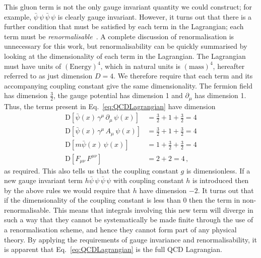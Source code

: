 This gluon term is not the only gauge invariant quantity we could construct; for example, $\bar{\psi}\,\psi\,\bar{\psi}\,\psi$ is clearly gauge invariant. However, it turns out that there is a further condition that must be satisfied by each term in the Lagrangian; each term must be \textit{renormalisable}~\cite{peskin2018introduction}. A complete discussion of renormalisation is unnecessary for this work, but renormalisability can be quickly summarised by looking at the dimensionality of each term in the Lagrangian. The Lagrangian must have units of $(\text{Energy})^4$, which in natural units is $(\text{mass})^4$,  hereafter referred to as just dimension $D=4$. We therefore require that each term and its accompanying coupling constant give the same dimensionality. The fermion field has dimension $\frac{3}{2}$, the gauge potential has dimension 1 and $\partial_\mu$ has dimension 1. Thus, the terms present in Eq.~\eqref{eq:QCDLagrangian} have dimension
%
\begin{align}
\text{D}[\bar{\psi}(x)\,\gamma^\mu\,\partial_\mu\,\psi(x)]&=\frac{3}{2}+1+\frac{3}{2}=4\\
\text{D}[\bar{\psi}(x)\,\gamma^\mu\,A_\mu\,\psi(x)]&=\frac{3}{2}+1+\frac{3}{2}=4\\
\text{D}[m\bar{\psi}(x)\,\psi(x)]&=1+\frac{3}{2}+\frac{3}{2}=4\\
\text{D}[F_{\mu\nu}\,F^{\mu\nu}] &= 2+2=4\, ,
\end{align}
%
as required. This also tells us that the coupling constant $g$ is dimensionless. If a new gauge invariant term $h\bar{\psi}\,\psi\,\bar{\psi}\,\psi$ with coupling constant $h$ is introduced then by the above rules we would require that $h$ have dimension $-2$. It turns out that if the dimensionality of the coupling constant is less than 0 then the term in non-renormalisable. This means that integrals involving this new term will diverge in such a way that they cannot be systematically be made finite through the use of a renormalisation scheme, and hence they cannot form part of any physical theory. By applying the requirements of gauge invariance and renormalisability, it is apparent that Eq.~\eqref{eq:QCDLagrangian} is the full QCD Lagrangian.

